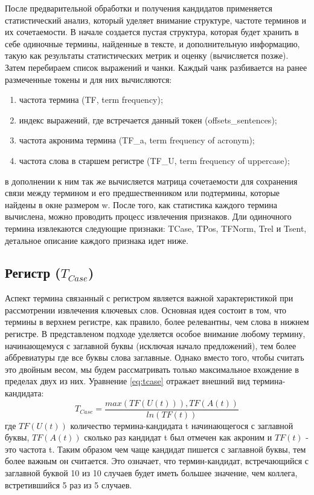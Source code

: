 После предварительной обработки и получения кандидатов применяется статистический анализ, который уделяет внимание структуре, частоте терминов и их сочетаемости.
В начале создается пустая структура, которая будет хранить в себе одиночные термины, найденные в тексте, и дополнительную информацию, такую как результаты статистических метрик и оценку (вычисляется позже).
Затем перебираем список выражений и чанки.
Каждый чанк разбивается на ранее размеченные токены и для них вычисляются:
\begin{enumerate}
	\item частота термина (TF, term frequency);
	\item индекс выражений, где встречается данный токен (offsets\_sentences);
	\item частота акронима термина (TF\_a, term frequency of acronym);
	\item частота слова в старшем регистре (TF\_U, term frequency of uppercase);
\end{enumerate}
в дополнении к ним так же вычисляется матрица сочетаемости для сохранения связи между термином и его предшественником или подтермины, которые найдены в окне размером w.
После того, как статистика каждого термина вычислена, можно проводить процесс извлечения признаков.
Дли одиночного термина извлекаются следующие признаки: TCase, TPos, TFNorm, Trel и Tsent, детальное описание каждого признака идет ниже.

\subsection{Регистр ($T_{Case}$)}

Аспект термина связанный с регистром является важной характеристикой при рассмотрении извлечения ключевых слов.
Основная идея состоит в том, что термины в верхнем регистре, как правило, более релевантны, чем слова в нижнем регистре. 
В представленом подходе уделяется особое внимание любому термину, начинающемуся с заглавной буквы (исключая начало предложений), тем более аббревиатуры где все буквы слова заглавные.
Однако вместо того, чтобы считать это двойным весом, мы будем рассматривать только максимальное вхождение в пределах двух из них. 
Уравнение \eqref{eq:tcase} отражает внешний вид термина-кандидата:
\begin{equation}
	\label{eq:tcase}
	T_{Case} = \frac{max(TF(U(t))), TF(A(t))}{ln(TF(t))}
\end{equation}
где $TF(U(t))$ количество термина-кандидата t начинающегося с заглавной буквы, $TF(A(t))$ сколько раз кандидат t был отмечен как акроним и $TF(t)$ - это частота t.
Таким образом чем чаще кандидат пишется с заглавной буквы, тем более важным он считается.
Это означает, что термин-кандидат, встречающийся с заглавной буквой 10 из 10 случаев будет иметь большее значение, чем коллега, встретившийся 5 раз из 5 случаев.

